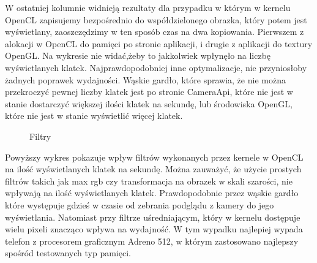 W ostatniej kolumnie widnieją rezultaty dla przypadku w którym w kernelu OpenCL zapisujemy bezpośrednio do współdzielonego obrazka, który potem jest wyświetlany, zaoszczędzimy w ten sposób czas na dwa kopiowania. Pierwszem z alokacji w OpenCL do pamięci po stronie aplikacji, i drugie z aplikacji do textury OpenGL. Na wykresie nie widać,żeby to jakkolwiek wpłynęło na liczbę wyświetlanych klatek. Najprawdopodobniej inne optymalizacje, nie przyniosłoby żadnych poprawek wydajności. Wąskie gardło, które sprawia, że nie można przekroczyć pewnej liczby klatek jest po stronie CameraApi, które nie jest w stanie dostarczyć większej ilości klatek na sekundę, lub środowiska OpenGL, które nie jest w stanie wyświetlić więcej klatek.

\begin{figure}[H]
\caption{Filtry}
\end{figure}
Powyższy wykres pokazuje wpływ filtrów wykonanych przez kernele w OpenCL na ilość wyświetlanych klatek na sekundę. Można zauważyć, że użycie prostych filtrów takich jak max rgb czy transformacja na obrazek w skali szarości, nie wpływają na ilość wyświetlanych klatek. Prawdopodobnie przez wąskie gardło które występuje gdzieś w czasie od zebrania podglądu z kamery do jego wyświetlania. Natomiast przy filtrze uśredniającym, który w kernelu dostępuje wielu pixeli znacząco wpływa na wydajność. W tym wypadku najlepiej wypada telefon z procesorem graficznym Adreno 512, w którym zastosowano najlepszy spośród testowanych typ pamięci.




